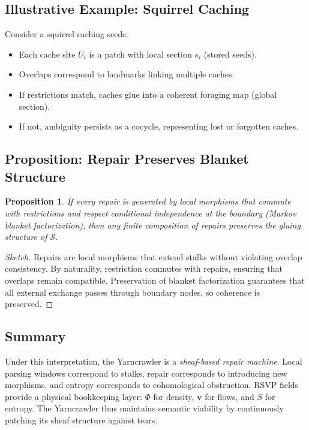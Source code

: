 \documentclass{article}
\newtheorem{proposition}{Proposition}
\begin{document}
\subsection{Illustrative Example: Squirrel Caching}

Consider a squirrel caching seeds:
\begin{itemize}
  \item Each cache site $U_i$ is a patch with local section $s_i$ (stored seeds).
  \item Overlaps correspond to landmarks linking multiple caches.
  \item If restrictions match, caches glue into a coherent foraging map (global section).
  \item If not, ambiguity persists as a cocycle, representing lost or forgotten caches.
\end{itemize}

\subsection{Proposition: Repair Preserves Blanket Structure}

\begin{proposition}
If every repair is generated by local morphisms that commute with restrictions and respect conditional independence at the boundary (Markov blanket factorization), then any finite composition of repairs preserves the gluing structure of $\mathcal{S}$.
\end{proposition}

\begin{proof}[Sketch]
Repairs are local morphisms that extend stalks without violating overlap consistency. 
By naturality, restriction commutes with repairs, ensuring that overlaps remain compatible. 
Preservation of blanket factorization guarantees that all external exchange passes through boundary nodes, so coherence is preserved.
\end{proof}

\subsection{Summary}

Under this interpretation, the Yarncrawler is a \emph{sheaf-based repair machine}. 
Local parsing windows correspond to stalks, repair corresponds to introducing new morphisms, and entropy corresponds to cohomological obstruction. 
RSVP fields provide a physical bookkeeping layer: $\Phi$ for density, $\mathbf{v}$ for flows, and $S$ for entropy. 
The Yarncrawler thus maintains semantic viability by continuously patching its sheaf structure against tears.
\end{document}
